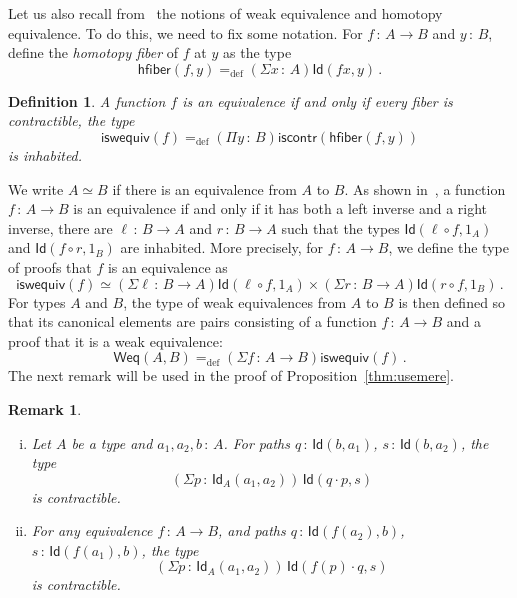 \documentclass[10pt,a4paper,oneside,reqno]{amsart}
\numberwithin{equation}{section}
\theoremstyle{mythm}
\theoremstyle{mydef}
\newtheorem{definition}[theorem]{Definition}
\theoremstyle{myrmk}
\newtheorem{remark}[theorem]{Remark}
\newcommand{\ie}{\text{i.e.\ }}
\newcommand{\defeq}{=_{\mathrm{def}}}
\newcommand{\co}{\,{:}\,}
\newcommand{\ct}{\cdot}
\newcommand{\hfiber}{\mathsf{hfiber}}
\newcommand{\iscontr}{\mathsf{iscontr}}
\newcommand{\iswequiv}{\mathsf{iswequiv}}
\newcommand{\Id}{\mathsf{Id}}
\begin{document}
Let us also recall from~\cite{VoevodskyV:unifc} the notions of weak equivalence and homotopy equivalence. To do this, we need to fix some notation. For $f \co A \rightarrow B$ and $y \co B$, define the \emph{homotopy fiber} of $f$ at $y$ as the type
\[
 \hfiber(f,y) \defeq (\Sigma x \co A) \Id(f x, y) \, .
\]


\begin{definition} A function $f$ is  an \emph{equivalence} if and only if every fiber is contractible, \ie the type
\[
 \iswequiv(f) \defeq (\Pi y \co B)  \iscontr(\hfiber(f,y)) 
\]
is inhabited. 
\end{definition}

 We write $A\simeq B$ if there is an equivalence from $A$ to $B$.   As shown in~\cite{HoTT}, a function $f \co A \rightarrow B$ is an equivalence if and only if  it has both a left inverse and a right inverse, \ie there are 
$\ell \co B \to A$ and $r \co B \to A$ such that the  types $ \Id(\ell \circ f, 1_A)$ and $\Id(f \circ r, 1_B)$ are inhabited. 
More precisely, for $f \co A \rightarrow B$, we define the type of proofs that $f$ is an equivalence as 
 \[ 
 \iswequiv(f) \simeq (\Sigma \ell \co B \to A) \Id( \ell \circ f, 1_A) \times (\Sigma r \co B \to A) \Id( r \circ f , 1_B) \, .
 \]
For types $A$ and $B$, the type of weak equivalences from $A$ to $B$ is then defined so that its canonical elements
are pairs consisting of a function $f \co A \to B$ and a proof that it is a weak equivalence:
 \begin{equation}
 \label{equ:weq}
 \mathsf{Weq}(A,B) \defeq (\Sigma f \co A \to B) \iswequiv(f) \, .
 \end{equation}
The next remark will be used in the proof of Proposition~\ref{thm:usemere}.

\begin{remark} \hfill \label{thm:useful}
\begin{enumerate}[(i)]
\item Let $A$ be a type and $a_1, a_2, b \co A$. For paths $q \co \Id(b,a_1)$, $s \co \Id(b,a_2)$, the type 
\[
(\Sigma p \co \Id_A(a_1,a_2)) \, \Id(q \ct p,s)
\] 
is contractible. 
\item For any equivalence $f \co A \to B$, and paths $q \co \Id(f(a_2),b)$, $s \co \Id(f(a_1),b)$, the type 
\[
(\Sigma p \co \Id_A(a_1,a_2)) \, \Id(f(p) \ct q,s)
\] 
is contractible.
\end{enumerate}
\end{remark}
\end{document}
